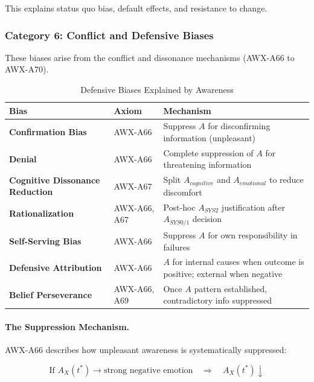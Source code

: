 This explains status quo bias, default effects, and resistance to change.

\subsubsection{Category 6: Conflict and Defensive Biases}

These biases arise from the conflict and dissonance mechanisms (AWX-A66 to AWX-A70).

\begin{table}[htbp]
\centering
\caption{Defensive Biases Explained by Awareness}
\label{tab:defensive-biases}
\renewcommand{\arraystretch}{1.4}
\begin{tabular}{@{}llp{5.5cm}@{}}
\toprule
\textbf{Bias} & \textbf{Axiom} & \textbf{Mechanism} \\
\midrule
\textbf{Confirmation Bias} & AWX-A66 & Suppress $A$ for disconfirming information (unpleasant) \\
\textbf{Denial} & AWX-A66 & Complete suppression of $A$ for threatening information \\
\textbf{Cognitive Dissonance Reduction} & AWX-A67 & Split $A_{cognitive}$ and $A_{emotional}$ to reduce discomfort \\
\textbf{Rationalization} & AWX-A66, A67 & Post-hoc $A_{SYS2}$ justification after $A_{SYS0/1}$ decision \\
\textbf{Self-Serving Bias} & AWX-A66 & Suppress $A$ for own responsibility in failures \\
\textbf{Defensive Attribution} & AWX-A66 & $A$ for internal causes when outcome is positive; external when negative \\
\textbf{Belief Perseverance} & AWX-A66, A69 & Once $A$ pattern established, contradictory info suppressed \\
\bottomrule
\end{tabular}
\end{table}

\paragraph{The Suppression Mechanism.}
AWX-A66 describes how unpleasant awareness is systematically suppressed:

\begin{equation}
\text{If } A_X(t^*) \rightarrow \text{strong negative emotion} \quad \Rightarrow \quad A_X(t^*) \downarrow
\end{equation}

